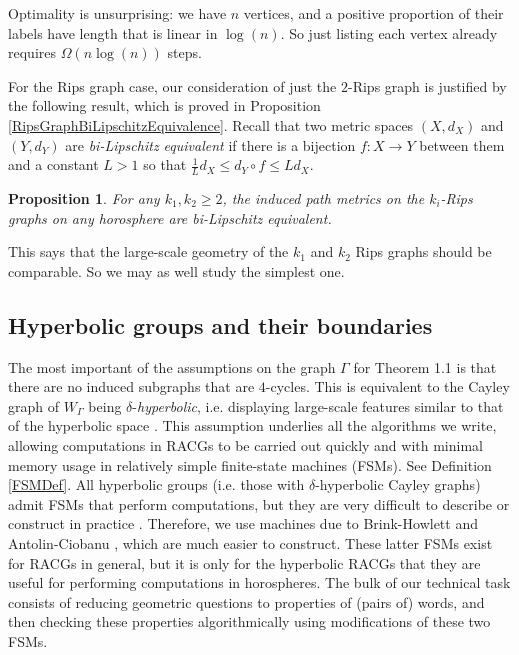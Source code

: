 \documentclass[10pt,a4paper]{amsart}
\newtheorem{proposition}[theorem]{Proposition}
\theoremstyle{definition}
\theoremstyle{remark}
\begin{document}
	Optimality is unsurprising: we have $n$ vertices, and a positive proportion of their labels have length that is linear in $\log(n)$. So just listing each vertex already requires $\Omega(n\log(n))$ steps.
	
	For the Rips graph case, our consideration of just the $2$-Rips graph is justified by the following result, which is proved in Proposition \ref{RipsGraphBiLipschitzEquivalence}. Recall that two metric spaces $(X, d_X)$ and $(Y, d_Y)$ are \textit{bi-Lipschitz equivalent} if there is a bijection $f:X\to Y$ between them and a constant $L>1$ so that $\frac{1}{L} d_X\le d_Y\circ f\le Ld_X$.
	
	\begin{proposition}
		
		For any $k_1, k_2\ge 2$, the induced path metrics on the $k_i$-Rips graphs on any horosphere are bi-Lipschitz equivalent.
		
	\end{proposition}

        This says that the large-scale geometry of the $k_1$ and $k_2$ Rips graphs should be comparable. So we may as well study the simplest one.
    
    \subsection*{Hyperbolic groups and their boundaries}
    
        The most important of the assumptions on the graph $\Gamma$ for Theorem 1.1 is that there are no induced subgraphs that are $4$-cycles. This is equivalent to the Cayley graph of $W_\Gamma$ being $\delta$-\textit{hyperbolic}, i.e. displaying large-scale features similar to that of the hyperbolic space \cite{GromovHyperbolic,Moussong}. This assumption underlies all the algorithms we write, allowing computations in RACGs to be carried out quickly and with minimal memory usage in relatively simple finite-state machines (FSMs). See Definition \ref{FSMDef}. All hyperbolic groups (i.e. those with $\delta$-hyperbolic Cayley graphs) admit FSMs that perform computations, but they are very difficult to describe or construct in practice \cite{WordProcessing}. Therefore, we use machines due to Brink-Howlett and Antolin-Ciobanu \cite{BrinkHowlett, AntolinCiobanu}, which are much easier to construct. These latter FSMs exist for RACGs in general, but it is only for the hyperbolic RACGs that they are useful for performing computations in horospheres. The bulk of our technical task consists of reducing geometric questions to properties of (pairs of) words, and then checking these properties algorithmically using modifications of these two FSMs.
	
\end{document}

